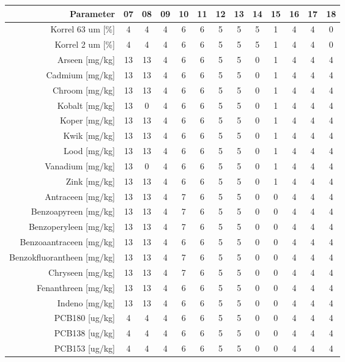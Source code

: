\begin{tabular}{ r |c | c | c | c | c |c | c | c | c | c | c | c } 
\rowcolor[HTML]{EFEFEF}  
 Parameter & 07 & 08 & 09 & 10 & 11 & 12 & 13 & 14 & 15 & 16 & 17 & 18 \\    \hline     
Korrel 63 um [\%] &4 & 4 & 4 & 6 & 6 & 5 & 5 & 5 & 1 & 4 & 4 & 0 \\
Korrel 2 um [\%] &4 & 4 & 4 & 6 & 6 & 5 & 5 & 5 & 1 & 4 & 4 & 0 \\
Arseen [mg/kg] &13 & 13 & 4 & 6 & 6 & 5 & 5 & 0 & 1 & 4 & 4 & 4 \\
Cadmium [mg/kg] &13 & 13 & 4 & 6 & 6 & 5 & 5 & 0 & 1 & 4 & 4 & 4 \\
Chroom [mg/kg] &13 & 13 & 4 & 6 & 6 & 5 & 5 & 0 & 1 & 4 & 4 & 4 \\
Kobalt [mg/kg] &13 & 0 & 4 & 6 & 6 & 5 & 5 & 0 & 1 & 4 & 4 & 4 \\
Koper [mg/kg] &13 & 13 & 4 & 6 & 6 & 5 & 5 & 0 & 1 & 4 & 4 & 4 \\
Kwik [mg/kg] &13 & 13 & 4 & 6 & 6 & 5 & 5 & 0 & 1 & 4 & 4 & 4 \\
Lood [mg/kg] &13 & 13 & 4 & 6 & 6 & 5 & 5 & 0 & 1 & 4 & 4 & 4 \\
Vanadium [mg/kg] &13 & 0 & 4 & 6 & 6 & 5 & 5 & 0 & 1 & 4 & 4 & 4 \\
Zink [mg/kg] &13 & 13 & 4 & 6 & 6 & 5 & 5 & 0 & 1 & 4 & 4 & 4 \\
Antraceen [mg/kg] &13 & 13 & 4 & 7 & 6 & 5 & 5 & 0 & 0 & 4 & 4 & 4 \\
Benzoapyreen [mg/kg] &13 & 13 & 4 & 7 & 6 & 5 & 5 & 0 & 0 & 4 & 4 & 4 \\
Benzoperyleen [mg/kg] &13 & 13 & 4 & 7 & 6 & 5 & 5 & 0 & 0 & 4 & 4 & 4 \\
Benzoaantraceen [mg/kg] &13 & 13 & 4 & 6 & 6 & 5 & 5 & 0 & 0 & 4 & 4 & 4 \\
Benzokfluorantheen [mg/kg] &13 & 13 & 4 & 7 & 6 & 5 & 5 & 0 & 0 & 4 & 4 & 4 \\
Chryseen [mg/kg] &13 & 13 & 4 & 7 & 6 & 5 & 5 & 0 & 0 & 4 & 4 & 4 \\
Fenanthreen [mg/kg] &13 & 13 & 4 & 6 & 6 & 5 & 5 & 0 & 0 & 4 & 4 & 4 \\
Indeno [mg/kg] &13 & 13 & 4 & 6 & 6 & 5 & 5 & 0 & 0 & 4 & 4 & 4 \\
PCB180 [ug/kg] &4 & 4 & 4 & 6 & 6 & 5 & 5 & 0 & 0 & 4 & 4 & 4 \\
PCB138 [ug/kg] &4 & 4 & 4 & 6 & 6 & 5 & 5 & 0 & 0 & 4 & 4 & 4 \\
PCB153 [ug/kg] &4 & 4 & 4 & 6 & 6 & 5 & 5 & 0 & 0 & 4 & 4 & 4 \\

\end{tabular}
